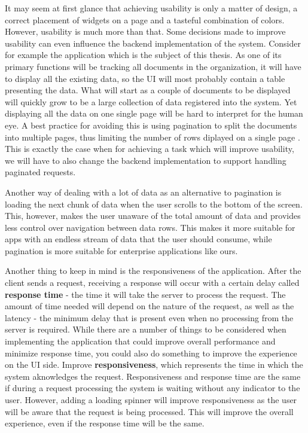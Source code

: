 It may seem at first glance that achieving usability is only a matter of design, a correct placement of widgets on a page and a tasteful combination of colors. However, usability is much more than that. Some decisions made to improve usability can even influence the backend implementation of the system. Consider for example the application which is the subject of this thesis. As one of its primary functions will be tracking all documents in the organization, it will have to display all the existing data, so the UI will most probably contain a table presenting the data. What will start as a couple of documents to be displayed will quickly grow to be a large collection of data registered into the system. Yet displaying all the data on one single page will be hard to interpret for the human eye. A best practice for avoiding this is using pagination to split the documents into multiple pages, thus limiting the number of rows diplayed on a single page \cite{modernEnterpriseUiDesign}. This is exactly the case when for achieving a task which will improve usability, we will have to also change the backend implementation to support handling paginated requests.

Another way of dealing with a lot of data as an alternative to pagination is loading the next chunk of data when the user scrolls to the bottom of the screen. This, however, makes the user unaware of the total amount of data and provides less control over navigation between data rows. This makes it more suitable for apps with an endless stream of data that the user should consume, while pagination is more suitable for enterprise applications like ours.

Another thing to keep in mind is the responsiveness of the application. After the client sends a request, receiving a response will occur with a certain delay called \textbf{response time} - the time it will take the server to process the request. The amount of time needed will depend on the nature of the request, as well as the latency - the minimum delay that is present even when no processing from the server is required. While there are a number of things to be considered when implementing the application that could improve overall performance and minimize response time, you could also do something to improve the experience on the UI side. Improve \textbf{responsiveness}, which represents the time in which the system aknowledges the request. Responsiveness and response time are the same if during a request processing the system is waiting without any indicator to the user. However, adding a loading spinner will improve responsiveness as the user will be aware that the request is being processed. This will improve the overall experience, even if the response time will be the same.
